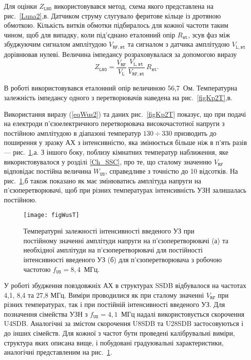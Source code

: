 Для оцінки $Z_\mathtt{LNO}$ використовувався метод,
схема якого представлена на рис.~\ref{Luna2},в.
Датчиком струму слугувало феритове кільце із дротяною обмоткою.
Кількість витків обмотки підбиралось для кожної частоти таким чином, щоб для випадку, коли під'єднано еталонний опір $R_\mathtt{st}$,
зсув фаз між збуджуючим сигналом амплітудою $V_\mathtt{RF,st}$ та сигналом з датчика амплітудою $V_\mathtt{L,st}$
дорівнював нулеві.
Величина імпедансу розраховувалася за допомогою виразу
 \begin{equation}
 \label{eqZlno}
 Z_\mathtt{LNO}=\frac{V_\mathtt{RF}}{V_\mathtt{L}}\,\frac{V_\mathtt{L,st}}{V_\mathtt{RF,st}}\,R_\mathtt{st}.
 \end{equation}

В роботі використовувався еталонний опір величиною 56,7~Ом.
Температурна залежність імпедансу одного з перетворювачів наведена на рис.~\ref{figKp2T},в.

Використання виразу (\ref{eqWus2}) та даних рис.~\ref{figKp2T} показує, що при подачі на електроди п'єзоелектричного перетворювача
високочастотної напруги з постійною амплітудою в діапазоні температур $130\div330$ призводить до поширення у зразку АХ з
інтенсивністю, яка змінюється більше ніж в п'ять разів --- рис.~\ref{figWusT},а.
З іншого боку, поблизу кімнатних температур наближення, яке використовувалося у розділі \ref{Ch_SSC}, про те, що сталому значенню
$V_\mathtt{RF}$ відповідає постійна величина $ W_\mathtt{US}$, справедливе з точністю до 10 відсотків.
На рис.~\ref{figWusT},б також показано як має змінюватись амплітуда напруги на п'єзоперетворювачі, щоб при різних температурах
інтенсивність УЗН залишалась постійною.


\begin{figure}
\center
\texttt{[image: figWusT]}%
\caption{\label{figWusT}
Температурні залежності
інтенсивності введеного УЗ при постійному значенні амплітуди напруги на п'єзоперетворювачі (а)
та необхідної амплітуди на п'єзоперетворювачі для постійності інтенсивності введеного УЗ (б)
для п'єзоперетворювача з робочою частотою $f_\mathtt{US}=8,4$~МГц.
}
\end{figure}

У роботі збудження повздовжніх АХ в структурах SSDB відбувалося на частотах 4,1, 8,4 та 27,8 МГц.
Виміри проводилися як при сталому значенні $V_\mathtt{RF}$ при різних температурах, так і при постійній інтенсивності введеного УЗ.
Для позначення сімейства УЗН з $f_\mathtt{US}=4,1$~МГц надалі використовується скорочення U4SDB.
Аналогічні за змістом скорочення U8SDB та U28SDB застосовуються і до інших сімейств.
Для кожної з частот бути проведені калібрувальні виміри, структура яких описана вище, і побудовані градуювальні характеристики,
аналогічні представленим на рис.~\ref{figWusT}.





